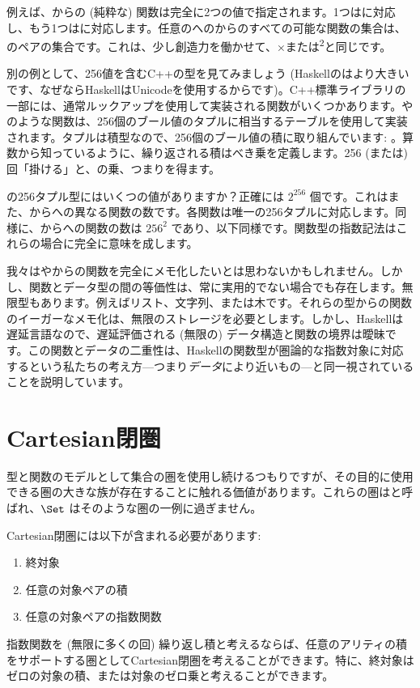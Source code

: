 例えば、からの (純粋な) 関数は完全に2つの値で指定されます。1つはに対応し、もう1つはに対応します。任意のへのからのすべての可能な関数の集合は、のペアの集合です。これは、少し創造力を働かせて、×または\textsuperscript{2}と同じです。

別の例として、256値を含むC++の型を見てみましょう (Haskellのはより大きいです、なぜならHaskellはUnicodeを使用するからです)。C++標準ライブラリの一部には、通常ルックアップを使用して実装される関数がいくつかあります。やのような関数は、256個のブール値のタプルに相当するテーブルを使用して実装されます。タプルは積型なので、256個のブール値の積に取り組んでいます: 。算数から知っているように、繰り返される積はべき乗を定義します。256 (または) 回「掛ける」と、の乗、つまり\textsuperscript{}を得ます。

の256タプル型にはいくつの値がありますか？正確には $2^{256}$ 個です。これはまた、からへの異なる関数の数です。各関数は唯一の256タプルに対応します。同様に、からへの関数の数は $256^{2}$ であり、以下同様です。関数型の指数記法はこれらの場合に完全に意味を成します。

我々はやからの関数を完全にメモ化したいとは思わないかもしれません。しかし、関数とデータ型の間の等価性は、常に実用的でない場合でも存在します。無限型もあります。例えばリスト、文字列、または木です。それらの型からの関数のイーガーなメモ化は、無限のストレージを必要とします。しかし、Haskellは遅延言語なので、遅延評価される (無限の) データ構造と関数の境界は曖昧です。この関数とデータの二重性は、Haskellの関数型が圏論的な指数対象に対応するという私たちの考え方---つまり\emph{データ}により近いもの---と同一視されていることを説明しています。

\section{Cartesian閉圏}

型と関数のモデルとして集合の圏を使用し続けるつもりですが、その目的に使用できる圏の大きな族が存在することに触れる価値があります。これらの圏はと呼ばれ、$\Set$ はそのような圏の一例に過ぎません。

Cartesian閉圏には以下が含まれる必要があります: 

\begin{enumerate}
  \tightlist
  \item
        終対象
  \item
        任意の対象ペアの積
  \item
        任意の対象ペアの指数関数
\end{enumerate}
指数関数を (無限に多くの回) 繰り返し積と考えるならば、任意のアリティの積をサポートする圏としてCartesian閉圏を考えることができます。特に、終対象はゼロの対象の積、または対象のゼロ乗と考えることができます。

